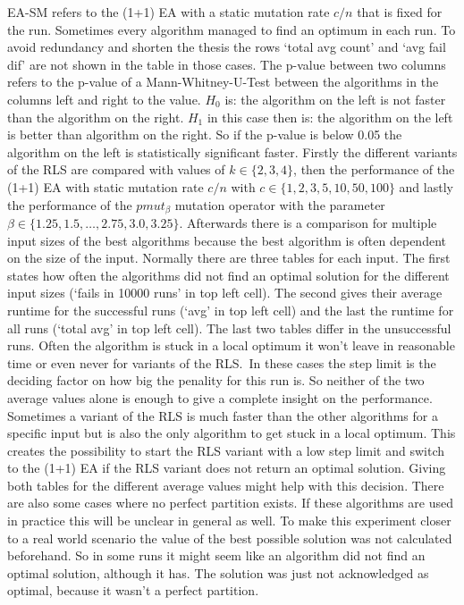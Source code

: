 EA-SM refers to the (1+1) EA with a static mutation rate $c/n$ that is fixed for the run.
Sometimes every algorithm managed to find an optimum in each run.
To avoid redundancy and shorten the thesis the rows `total avg count' and `avg fail dif' are not shown in the table in those cases.
The p-value between two columns refers to the p-value of a Mann-Whitney-U-Test between the algorithms in the columns left and right to the value.
$H_0$ is: the algorithm on the left is not faster than the algorithm on the right.
$H_1$ in this case then is: the algorithm on the left is better than algorithm on the right.
So if the p-value is below 0.05 the algorithm on the left is statistically significant faster.\newline
Firstly the different variants of the RLS are compared with values of $k \in\{2,3,4\}$, then the performance of the (1+1) EA with static mutation rate $c/n$ with $c \in\{1,2,3,5,10,50,100\}$ and lastly the performance of the $pmut_\beta$ mutation operator with the parameter $\beta \in \{1.25, 1.5, \dots, 2.75,3.0,3.25\}$.
Afterwards there is a comparison for multiple input sizes of the best algorithms because the best algorithm is often dependent on the size of the input.
Normally there are three tables for each input.
The first states how often the algorithms did not find an optimal solution for the different input sizes (`fails in 10000 runs' in top left cell).
The second gives their average runtime for the successful runs (`avg' in top left cell) and the last the runtime for all runs (`total avg' in top left cell).
The last two tables differ in the unsuccessful runs.
Often the algorithm is stuck in a local optimum it won't leave in reasonable time or even never for variants of the RLS.\
In these cases the step limit is the deciding factor on how big the penality for this run is.
So neither of the two average values alone is enough to give a complete insight on the performance.
Sometimes a variant of the RLS is much faster than the other algorithms for a specific input but is also the only algorithm to get stuck in a local optimum.
This creates the possibility to start the RLS variant with a low step limit and switch to the (1+1) EA if the RLS variant does not return an optimal solution.
Giving both tables for the different average values might help with this decision.
There are also some cases where no perfect partition exists.
If these algorithms are used in practice this will be unclear in general as well.
To make this experiment closer to a real world scenario the value of the best possible solution was not calculated beforehand.
So in some runs it might seem like an algorithm did not find an optimal solution, although it has.
The solution was just not acknowledged as optimal, because it wasn't a perfect partition.

